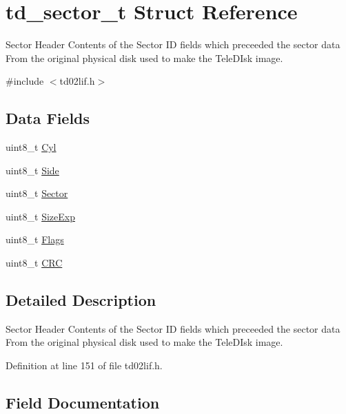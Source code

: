 \hypertarget{structtd__sector__t}{}\section{td\+\_\+sector\+\_\+t Struct Reference}
\label{structtd__sector__t}


Sector Header Contents of the Sector ID fields which preceeded the sector data From the original physical disk used to make the Tele\+D\+Isk image.  




{\ttfamily \#include $<$td02lif.\+h$>$}

\subsection*{Data Fields}
\begin{DoxyCompactItemize}
\item 
uint8\+\_\+t \hyperlink{structtd__sector__t_afddd9f1e3a41cc6e3a9be2478cd3305b}{Cyl}
\item 
uint8\+\_\+t \hyperlink{structtd__sector__t_ae8f05b8d6e903e618f6adec8973221f7}{Side}
\item 
uint8\+\_\+t \hyperlink{structtd__sector__t_a703252220f745cd6adfedadd5cc993d6}{Sector}
\item 
uint8\+\_\+t \hyperlink{structtd__sector__t_addc6d434740a76aebde544a9beab1b6b}{Size\+Exp}
\item 
uint8\+\_\+t \hyperlink{structtd__sector__t_ad30cfc0c6589ff25f8456ada5b352efa}{Flags}
\item 
uint8\+\_\+t \hyperlink{structtd__sector__t_aaccfa1ee85151410b042457fc5b584e5}{C\+RC}
\end{DoxyCompactItemize}


\subsection{Detailed Description}
Sector Header Contents of the Sector ID fields which preceeded the sector data From the original physical disk used to make the Tele\+D\+Isk image. 

Definition at line 151 of file td02lif.\+h.



\subsection{Field Documentation}
\mbox{\label{structtd__sector__t_aaccfa1ee85151410b042457fc5b584e5}} 
